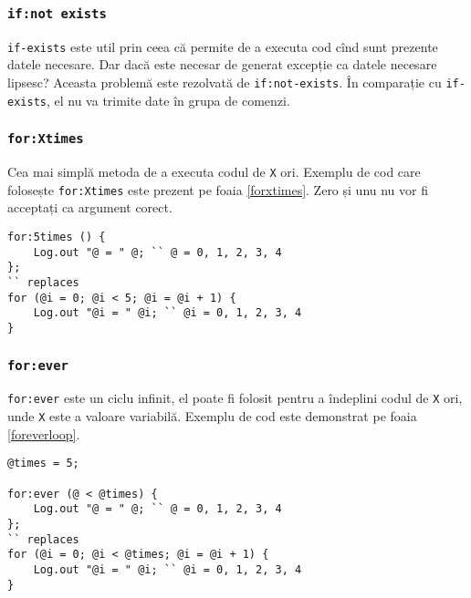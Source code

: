 \subsubsection{\texttt{if:not exists}}

\texttt{if-exists} este util prin ceea că permite de a executa cod cînd sunt prezente datele necesare. Dar dacă este necesar de generat excepție ca datele necesare lipsesc? Aceasta problemă este rezolvată de \texttt{if:not-exists}. În comparație cu \texttt{if-exists}, el nu va trimite date în grupa de comenzi.

\subsubsection{\texttt{for:Xtimes}}

Cea mai simplă metoda de a executa codul de \texttt{X} ori. Exemplu de cod care folosește \texttt{for:Xtimes} este prezent pe foaia \ref{forxtimes}. Zero și unu nu vor fi acceptați ca argument corect.

\begin{sourcecode}
\label{forxtimes}
\begin{verbatim}
for:5times () {
	Log.out "@ = " @; `` @ = 0, 1, 2, 3, 4
};
`` replaces
for (@i = 0; @i < 5; @i = @i + 1) {
	Log.out "@i = " @i; `` @i = 0, 1, 2, 3, 4
}
\end{verbatim}
\end{sourcecode}

\subsubsection{\texttt{for:ever}}

\texttt{for:ever} este un ciclu infinit, el poate fi folosit pentru a îndeplini codul de \texttt{X} ori, unde \texttt{X} este a valoare variabilă. Exemplu de cod este demonstrat pe foaia \ref{foreverloop}.

\begin{sourcecode}
\label{foreverloop}
\begin{verbatim}
@times = 5;

for:ever (@ < @times) {
	Log.out "@ = " @; `` @ = 0, 1, 2, 3, 4
};
`` replaces
for (@i = 0; @i < @times; @i = @i + 1) {
	Log.out "@i = " @i; `` @i = 0, 1, 2, 3, 4
}
\end{verbatim}
\end{sourcecode}


